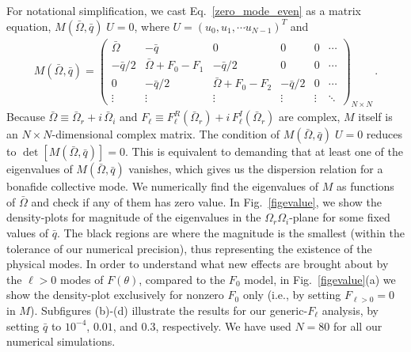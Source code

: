 \documentclass[aps, prb, onecolumn, nofootinbib, citeautoscript, 10pt]{revtex4-2}
\begin{document}
For notational simplification, we cast Eq.~\eqref{zero_mode_even} as a matrix equation, 
$	M(\bar{\Omega},\bar{q}) \; U=0$, where $U=\left(u_0,u_1,\cdots u_{N-1}\right)^T$ and
\begin{align}
	\label{eqM}
	M(\bar{\Omega},\bar{q}) = \begin{pmatrix}
		\bar{\Omega} & -\bar{q}  & 0 & 0 & 0 & \cdots \\
		-\bar{q}/2 & \bar{\Omega} + F_0 -F_1 & -\bar{q}/2 & 0 & 0 & \cdots\\
		0  & -\bar{q}/2 & \bar{\Omega} + F_0 -F_2 & -\bar{q}/2 & 0 & \cdots \\
		\vdots & \vdots & \vdots & \vdots & \vdots & \ddots 
	\end{pmatrix}_{N \times N} \,.
\end{align}
Because $\bar{\Omega} \equiv \bar{\Omega}_r+i\, \bar{\Omega}_i$ and $F_\ell \equiv F^R_\ell (\bar{\Omega}_r)+i \,F^I_\ell (\bar{\Omega}_r)$ are complex, $M$ itself is an $N\times N$-dimensional complex matrix.
The condition of $ M(\bar{\Omega},\bar{q}) \; U=0$ reduces to $\det  [M(\bar{\Omega},\bar{q})]=0$. This is equivalent to demanding that at least one of the eigenvalues of $M(\bar{\Omega},\bar{q})$ vanishes, which gives us the dispersion relation for a bonafide collective mode. We numerically find the eigenvalues of $M$ as functions of $\bar{\Omega}$ and check if any of them has zero value. In Fig.~\ref{figevalue}, we show the density-plots for magnitude of the  eigenvalues in the $\Omega_r \Omega_i$-plane for some fixed values of $\bar{q}$. The black regions are where the magnitude is the smallest (within the tolerance of our numerical precision), thus representing the existence of the physical modes.  In order to understand what new effects are brought about by the $\ell>0$ modes of $F(\theta)$, compared to the $F_0$ model, in Fig.~\ref{figevalue}(a) we show the density-plot exclusively for nonzero $F_0 $ only (i.e., by setting $F_{\ell>0} = 0 $ in $M$). Subfigures (b)-(d) illustrate the results for our generic-$F_\ell$ analysis, by setting $\bar{q}$ to $ 10^{-4}$, $0.01$, and $0.3$, respectively. We have used $ N= 80$ for all our numerical simulations.
\end{document}
